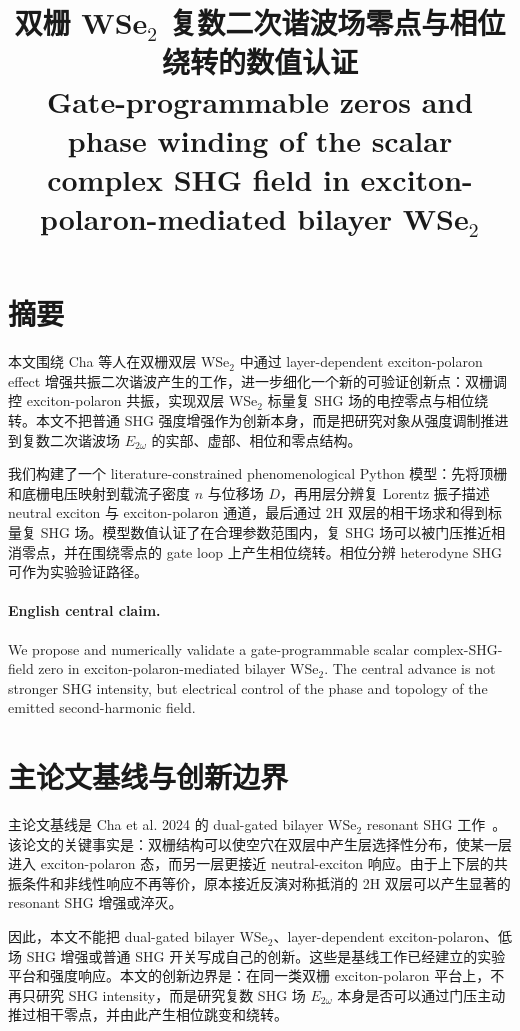 \documentclass[UTF8,a4paper,11pt]{ctexart}
\title{\bfseries 双栅 WSe$_2$ 复数二次谐波场零点与相位绕转的数值认证\\
\large Gate-programmable zeros and phase winding of the scalar complex SHG field in exciton-polaron-mediated bilayer WSe$_2$}
\author{}
\date{}
\begin{document}
\maketitle

\section*{摘要}
本文围绕 Cha 等人在双栅双层 WSe$_2$ 中通过 layer-dependent exciton-polaron effect 增强共振二次谐波产生的工作，进一步细化一个新的可验证创新点：双栅调控 exciton-polaron 共振，实现双层 WSe$_2$ 标量复 SHG 场的电控零点与相位绕转。本文不把普通 SHG 强度增强作为创新本身，而是把研究对象从强度调制推进到复数二次谐波场 $E_{2\omega}$ 的实部、虚部、相位和零点结构。

我们构建了一个 literature-constrained phenomenological Python 模型：先将顶栅和底栅电压映射到载流子密度 $n$ 与位移场 $D$，再用层分辨复 Lorentz 振子描述 neutral exciton 与 exciton-polaron 通道，最后通过 2H 双层的相干场求和得到标量复 SHG 场。模型数值认证了在合理参数范围内，复 SHG 场可以被门压推近相消零点，并在围绕零点的 gate loop 上产生相位绕转。相位分辨 heterodyne SHG 可作为实验验证路径。

\paragraph{English central claim.}
We propose and numerically validate a gate-programmable scalar complex-SHG-field zero in exciton-polaron-mediated bilayer WSe$_2$. The central advance is not stronger SHG intensity, but electrical control of the phase and topology of the emitted second-harmonic field.

\section{主论文基线与创新边界}
主论文基线是 Cha et al. 2024 的 dual-gated bilayer WSe$_2$ resonant SHG 工作~\cite{cha2024}。该论文的关键事实是：双栅结构可以使空穴在双层中产生层选择性分布，使某一层进入 exciton-polaron 态，而另一层更接近 neutral-exciton 响应。由于上下层的共振条件和非线性响应不再等价，原本接近反演对称抵消的 2H 双层可以产生显著的 resonant SHG 增强或淬灭。

因此，本文不能把 dual-gated bilayer WSe$_2$、layer-dependent exciton-polaron、低场 SHG 增强或普通 SHG 开关写成自己的创新。这些是基线工作已经建立的实验平台和强度响应。本文的创新边界是：在同一类双栅 exciton-polaron 平台上，不再只研究 SHG intensity，而是研究复数 SHG 场 $E_{2\omega}$ 本身是否可以通过门压主动推过相干零点，并由此产生相位跳变和绕转。
\end{document}
